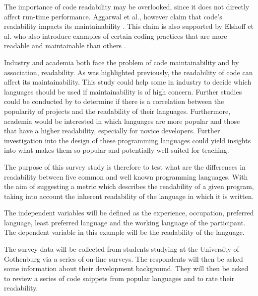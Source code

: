 \documentclass[times, 10pt,twocolumn]{IEEEtran}
\begin{document}
The importance of code readability may be overlooked, since it does not directly affect run-time performance. Aggarwal et al., however claim that code's readability impacts its maintainability \cite{aggarwal2002integrated}. This claim is also supported by \cite{elshoff1982improving} Elshoff et al. who also introduce examples of certain coding practices that are more readable and maintainable than others \cite{elshoff1982improving}.




Industry and academia both face the problem of code maintainability and by association, readability. As was highlighted previously, the readability of code can affect its maintainability. This study could help some in industry to decide which languages should be used if maintainability is of high concern. Further studies could be conducted by to determine if there is a correlation between the popularity of projects and the readability of their languages. Furthermore, academia would be interested in which languages are more popular and those that have a higher readability, especially for novice developers. Further investigation into the design of these programming languages could yield insights into what makes them so popular and potentially well suited for teaching.
\newline

The purpose of this survey study is therefore to test what are the differences in readability between five common and well known programming languages. With the aim of suggesting a metric which describes the readability of a given program, taking into account the inherent readability of the language in which it is written.
\newline

The independent variables will be defined as the experience, occupation, preferred language, least preferred language and the working language of the participant. The dependent variable in this example will be the readability of the language.
\newline

The survey data will be collected from students studying at the University of Gothenburg via a series of on-line surveys. The respondents will then be asked some information about their development background. They will then be asked to review a series of code snippets from popular languages and to rate their readability. 
\newline
\end{document}
